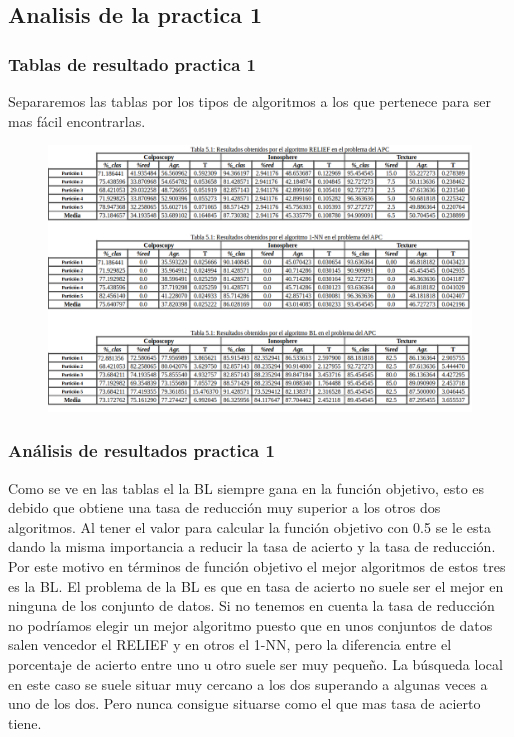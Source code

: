 \documentclass[titlepage]{article}
\begin{document}
	\subsection{Analisis de la practica 1}
	\subsubsection{Tablas de resultado practica 1}
	
	Separaremos las tablas por los tipos de algoritmos a los que pertenece para ser mas fácil encontrarlas.
	\begin{figure}[H]
		\centering
		\includegraphics[width=1\linewidth]{screenshot004}
		\caption{}
		\label{fig:screenshot004}
	\end{figure}
	
	
	\subsubsection{Análisis de resultados practica 1}
	Como se ve en las tablas el la BL siempre gana en la función objetivo, esto es debido que obtiene una tasa de reducción muy superior a los otros dos algoritmos. Al tener el valor para calcular la función objetivo con 0.5 se le esta dando la misma importancia a reducir la tasa de acierto y la tasa de reducción. Por este motivo en términos de función objetivo el mejor algoritmos de estos tres es la BL. El problema de la BL es que en tasa de acierto no suele ser el mejor en ninguna de los conjunto de datos. Si no tenemos en cuenta la tasa de reducción no podríamos elegir un mejor algoritmo puesto que en unos conjuntos de datos salen vencedor el RELIEF y en otros el 1-NN, pero la diferencia entre el porcentaje de acierto entre uno u otro suele ser muy pequeño. La búsqueda local en este caso se suele situar muy cercano a los dos superando a algunas veces a uno de los dos. Pero nunca consigue situarse como el que mas tasa de acierto tiene.
	
\end{document}
